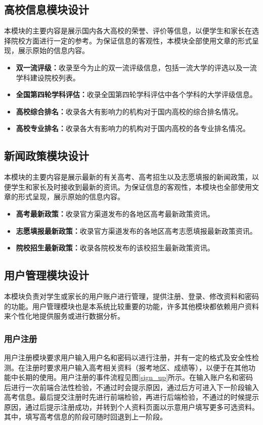 \documentclass[a4paper,AutoFakeBold,oneside,12pt]{book}
\begin{document}
\subsection{高校信息模块设计}
本模块的主要内容是展示国内各大高校的荣誉、评价等信息，以便学生和家长在选择院校方面进行一定的参考。为保证信息的客观性，本模块全部使用文章的形式呈现，展示原始的信息内容。

\begin{itemize}
\item \textbf{双一流评级：}收录至今为止的双一流评级信息，包括一流大学的评选以及一流学科建设院校列表。
\item \textbf{全国第四轮学科评估：}收录全国第四轮学科评估中各个学科的大学评级信息。
\item \textbf{高校综合排名：}收录各大有影响力的机构对于国内高校的综合排名情况。
\item \textbf{高校专业排名：}收录各大有影响力的机构对于国内高校的各专业排名情况。
\end{itemize}

\subsection{新闻政策模块设计}
本模块的主要内容是展示最新的有关高考、高考招生以及志愿填报的新闻政策，以便学生和家长及时接收到最新的资讯。为保证信息的客观性，本模块也全部使用文章的形式呈现，展示原始的信息内容。

\begin{itemize}
\item \textbf{高考最新政策：}收录官方渠道发布的各地区高考最新政策资讯。
\item \textbf{志愿填报最新政策：}收录官方渠道发布的各地区高考志愿填报最新政策资讯。
\item \textbf{院校招生最新政策：}收录各院校发布的该校招生最新政策资讯。
\end{itemize}

\subsection{用户管理模块设计}
本模块负责对学生或家长的用户账户进行管理，提供注册、登录、修改资料和密码的功能。用户管理模块也是本系统比较重要的功能，许多其他模块都依赖用户资料来个性化地提供服务或进行数据分析。

\subsubsection{用户注册}
用户注册模块要求用户输入用户名和密码以进行注册，并有一定的格式及安全性检测。在注册时要求用户输入高考相关资料（报考地区、成绩等），以便于在其他功能中长期的使用。用户注册的事件流程见图\ref{sign_up}所示。在输入账户名和密码后进行一次前端合法性检验，不通过时会提示原因，通过后方可进入下一阶段输入高考信息。最后提交注册时先进行前端检验，再进行后端检验，不通过的时候提示原因，通过后提示注册成功，并转到个人资料页面以示意用户填写更多可选资料。其中，填写高考信息的阶段可随时回退到上一阶段。
\end{document}
